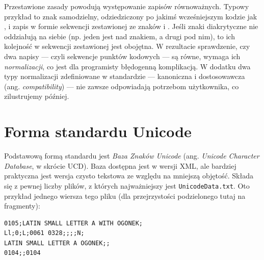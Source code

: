 



Przestawione zasady powodują występowanie zapisów równoważnych. Typowy
przykład to znak samodzielny, odziedziczony po jakimś wcześniejszym
kodzie jak , i zapis w formie
sekwencji zestawionej ze znaków  i
.  Jeśli znaki diakrytyczne nie oddziałują
na siebie (np. jeden jest nad znakiem, a drugi pod nim), to ich
kolejność w sekwencji zestawionej jest obojętna. W rezultacie
sprawdzenie, czy dwa napisy --- czyli sekwencje punktów kodowych ---
są równe, wymaga ich \textit{normalizacji}, co jest dla programisty
błędogenną komplikacją. W dodatku dwa typy normalizacji zdefiniowane w
standardzie --- kanoniczna i dostosowawcza
(ang. \textit{compatibility}) --- nie zawsze odpowiadają potrzebom
użytkownika, co zilustrujemy później.

\section{Forma standardu Unicode}
\label{sec:forma-stand-unic}

Podstawową formą standardu jest \textit{Baza Znaków Unicode}
(ang. \textit{Unicode Character Database}, w skrócie UCD).  Baza
dostępna jest w wersji XML, ale bardziej praktyczna jest wersja czysto
tekstowa ze względu na mniejszą objętość. Składa się z pewnej liczby
plików, z których najważniejszy jest \texttt{UnicodeData.txt}. Oto
przykład jednego wiersza tego pliku (dla przejrzystości podzielonego
tutaj na fragmenty):

{%
\begin{verbatim}
0105;LATIN SMALL LETTER A WITH OGONEK;
Ll;0;L;0061 0328;;;;N;
LATIN SMALL LETTER A OGONEK;;
0104;;0104
\end{verbatim}
}

